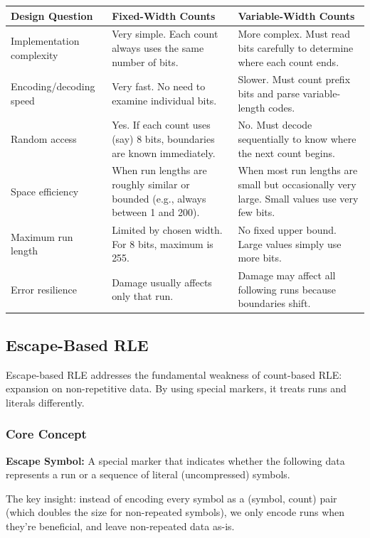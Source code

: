 \begin{tabular}{|p{3.5cm}|p{5.5cm}|p{5.5cm}|}
\hline
\textbf{Design Question} & \textbf{Fixed-Width Counts} & \textbf{Variable-Width Counts} \\
\hline
Implementation complexity & Very simple. Each count always uses the same number of bits. & More complex. Must read bits carefully to determine where each count ends. \\
\hline
Encoding/decoding speed & Very fast. No need to examine individual bits. & Slower. Must count prefix bits and parse variable-length codes. \\
\hline
Random access & Yes. If each count uses (say) 8 bits, boundaries are known immediately. & No. Must decode sequentially to know where the next count begins. \\
\hline
Space efficiency & When run lengths are roughly similar or bounded (e.g., always between 1 and 200). & When most run lengths are small but occasionally very large. Small values use very few bits. \\
\hline
Maximum run length & Limited by chosen width. For 8 bits, maximum is 255. & No fixed upper bound. Large values simply use more bits. \\
\hline
Error resilience & Damage usually affects only that run. & Damage may affect all following runs because boundaries shift. \\
\hline
\end{tabular}

\newpage
\subsection{Escape-Based RLE}

Escape-based RLE addresses the fundamental weakness of count-based RLE: expansion on non-repetitive data. By using special markers, it treats runs and literals differently.

\subsubsection{Core Concept}

\begin{definitionbox}
\textbf{Escape Symbol:} A special marker that indicates whether the following data represents a run or a sequence of literal (uncompressed) symbols.
\end{definitionbox}

The key insight: instead of encoding every symbol as a (symbol, count) pair (which doubles the size for non-repeated symbols), we only encode runs when they're beneficial, and leave non-repeated data as-is.

